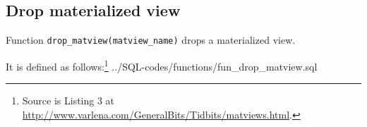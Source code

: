 \subsection{Drop materialized view}\label{subsec_appx_fun_drop_matview}

Function \texttt{drop\_matview(matview\_name)} drops a materialized view.

It is defined as follows:\footnote{Source is Listing 3 at \url{http://www.varlena.com/GeneralBits/Tidbits/matviews.html}.} 
%
{../SQL-codes/functions/fun_drop_matview.sql}

